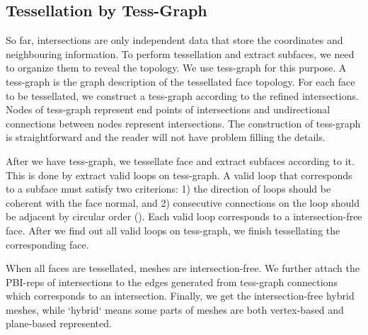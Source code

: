 \documentclass[10pt,journal,compsoc]{IEEEtran}
\begin{document}

\subsection{Tessellation by Tess-Graph}
\label{sec:tess}
So far, intersections are only independent data that store the coordinates and neighbouring information. To perform tessellation and extract subfaces, we need to organize them to reveal the topology. We use tess-graph for this purpose. A tess-graph is the graph description of the tessellated face topology. For each face to be tessellated, we construct a tess-graph according to the refined intersections. Nodes of tess-graph represent end points of intersections and undirectional connections between nodes represent intersections. The construction of tess-graph is straightforward and the reader will not have problem filling the details.

After we have tess-graph, we tessellate face and extract subfaces according to it. This is done by extract valid loops on tess-graph. A valid loop that corresponds to a subface must satisfy two criterions: 1) the direction of loops should be coherent with the face normal, and 2) consecutive connections on the loop should be adjacent by circular order ({\color{red}{Fig.?}}). Each valid loop corresponds to a intersection-free face. After we find out all valid loops on tess-graph, we finish tessellating the corresponding face.

When all faces are tessellated, meshes are intersection-free. We further attach the PBI-reps of intersections to the edges generated from tess-graph connections which corresponds to an intersection. Finally, we get the intersection-free hybrid meshes, while `hybrid` means some parts of meshes are both vertex-based and plane-based represented.


\end{document}
